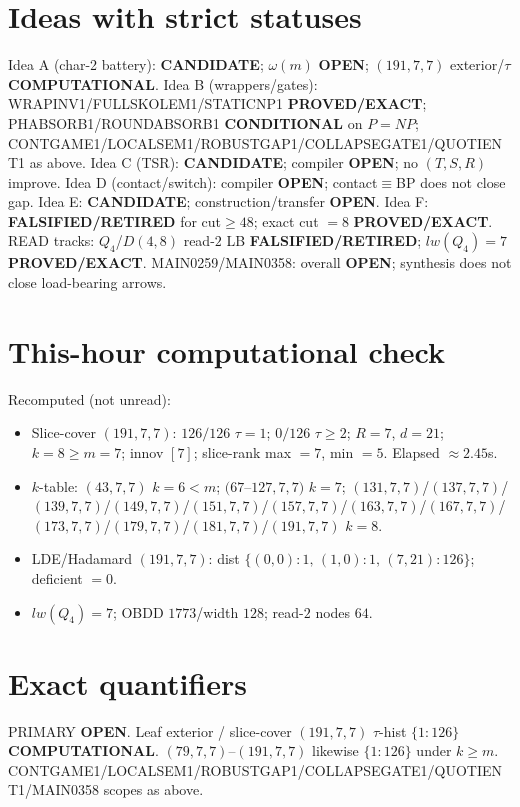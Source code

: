 \documentclass[11pt]{article}
\begin{document}
\section*{Ideas with strict statuses}
Idea A (char-2 battery): \textbf{CANDIDATE}; $\omega(m)$ \textbf{OPEN}; $(191,7,7)$ exterior/$\tau$ \textbf{COMPUTATIONAL}.
Idea B (wrappers/gates): WRAPINV1/FULLSKOLEM1/STATICNP1 \textbf{PROVED/EXACT};
PHABSORB1/ROUNDABSORB1 \textbf{CONDITIONAL} on $P=NP$;
CONTGAME1/LOCALSEM1/ROBUSTGAP1/COLLAPSEGATE1/QUOTIENT1 as above.
Idea C (TSR): \textbf{CANDIDATE}; compiler \textbf{OPEN}; no $(T,S,R)$ improve.
Idea D (contact/switch): compiler \textbf{OPEN}; contact$\equiv$BP does not close gap.
Idea E: \textbf{CANDIDATE}; construction/transfer \textbf{OPEN}.
Idea F: \textbf{FALSIFIED/RETIRED} for cut$\ge48$; exact cut $=8$ \textbf{PROVED/EXACT}.
READ tracks: $Q_4$/$D(4,8)$ read-$2$ LB \textbf{FALSIFIED/RETIRED}; $lw(Q_4)=7$ \textbf{PROVED/EXACT}.
MAIN0259/MAIN0358: overall \textbf{OPEN}; synthesis does not close load-bearing arrows.

\section*{This-hour computational check}
Recomputed (not unread):
\begin{itemize}
\item Slice-cover $(191,7,7)$: $126/126$ $\tau{=}1$; $0/126$ $\tau{\ge}2$; $R{=}7$, $d{=}21$;
  $k{=}8{\ge}m{=}7$; innov $[7]$; slice-rank max $=7$, min $=5$. Elapsed $\approx2.45$s.
\item $k$-table: $(43,7,7)$ $k{=}6{<}m$; $(67$--$127,7,7)$ $k{=}7$;
  $(131,7,7)$/$(137,7,7)$/$(139,7,7)$/$(149,7,7)$/$(151,7,7)$/$(157,7,7)$/$(163,7,7)$/$(167,7,7)$/$(173,7,7)$/$(179,7,7)$/$(181,7,7)$/$(191,7,7)$ $k{=}8$.
\item LDE/Hadamard $(191,7,7)$: dist $\{(0,0){:}1,\,(1,0){:}1,\,(7,21){:}126\}$; deficient $=0$.
\item $lw(Q_4)=7$; OBDD $1773$/width $128$; read-$2$ nodes $64$.
\end{itemize}

\section*{Exact quantifiers}
PRIMARY \textbf{OPEN}. Leaf exterior / slice-cover $(191,7,7)$ $\tau$-hist $\{1{:}126\}$ \textbf{COMPUTATIONAL}.
$(79,7,7)$--$(191,7,7)$ likewise $\{1{:}126\}$ under $k{\ge}m$. CONTGAME1/LOCALSEM1/ROBUSTGAP1/COLLAPSEGATE1/QUOTIENT1/MAIN0358 scopes as above.
\end{document}
